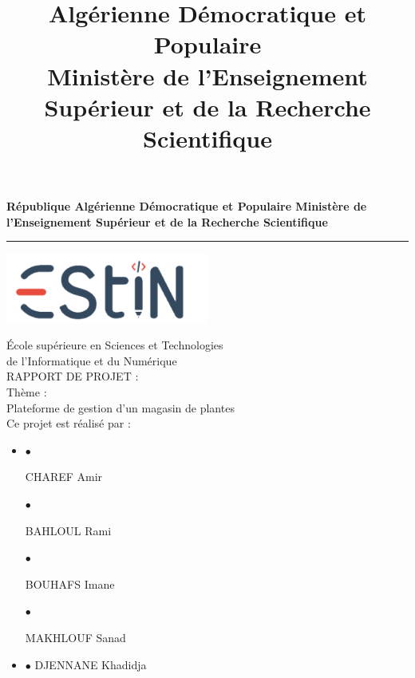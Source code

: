 \documentclass[a4paper,12pt,oneside]{article}
\title{Algérienne Démocratique et Populaire\\
Ministère de l’Enseignement Supérieur et de la Recherche
Scientifique}
\begin{document}
\begin{titlepage}

    \centering
    \vfill
{\bfseries\Large
        République Algérienne Démocratique et Populaire 
		Ministère de l’Enseignement Supérieur et de la Recherche
		Scientifique\\
		\vskip1cm
		\hrule


		\begin{center}
		
		\includegraphics[width=0.5\textwidth]{ESTIN-LOGO}
		
		\end{center}
		
		
  		

		
        École supérieure en Sciences et Technologies\\
        de l'Informatique et du Numérique\\
        
        \vskip1cm
        {\Huge RAPPORT DE PROJET :}\\
        \vskip1cm
        Thème :\\ Plateforme de gestion d'un magasin de plantes\\
        \vskip1cm
        Ce projet est réalisé par : \\
        
  		
  		\begin{itemize}
    		\item[]
    		\begin{minipage}[t]{0.05\linewidth}
        $\bullet$
    		\end{minipage}
    		\begin{minipage}[t]{0.45\linewidth}
        CHAREF Amir
    		\end{minipage}
    		\begin{minipage}[t]{0.05\linewidth}
        $\bullet$
    		\end{minipage}
    		\begin{minipage}[t]{0.45\linewidth}
        BAHLOUL Rami 
    		\end{minipage}
    		\begin{minipage}[t]{0.05\linewidth}
        $\bullet$
    		\end{minipage}
    		\begin{minipage}[t]{0.45\linewidth}
        BOUHAFS Imane
    		\end{minipage}
    		\begin{minipage}[t]{0.05\linewidth}
        $\bullet$
    		\end{minipage}
    		\begin{minipage}[t]{0.45\linewidth}
        MAKHLOUF Sanad
    		\end{minipage}
    		\item[]
    		\begin{center}
         $\bullet$  DJENNANE Khadidja
    		\end{center}
    		

\end{itemize}}
\end{titlepage}
\end{document}
